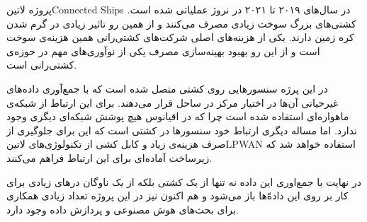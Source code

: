 
پروژه ‌لاتین{Connected Ships} در سال‌های ۲۰۱۹ تا ۲۰۲۱ در نروژ عملیاتی شده است.
کشتی‌های بزرگ سوخت زیادی مصرف می‌کنند و از همین رو تاثیر زیادی در گرم شدن کره زمین دارند.
یکی از هزینه‌های اصلی شرکت‌های کشتی‌رانی همین هزینه‌ی سوخت است و از این رو بهبود بهینه‌سازی مصرف
یکی از نوآوری‌های مهم در حوزه‌ی کشتی‌رانی است.

در این پرژه سنسورهایی روی کشتی متصل شده است که با جمع‌آوری داده‌های غیرحیاتی آن‌ها در اختیار مرکز در ساحل قرار می‌دهند.
برای این ارتباط از شبکه‌ی ماهواره‌ای استفاده شده است چرا که در اقیانوس هیچ پوشش شبکه‌ای دیگری وجود ندارد.
اما مساله دیگری ارتباط خود سنسورها در کشتی است که این برای جلوگیری از صرف هزینه‌ی زیاد و کابل کشی از تکنولوژی‌های ‌لاتین{LPWAN}
استفاده خواهد شد که زیرساخت آماده‌ای برای این ارتباط فراهم می‌کنند.

در نهایت با جمع‌اوری این داده نه تنها از یک کشتی بلکه از یک ناوگان درهای زیادی برای کار بر روی این داده‌ّها باز می‌شود و هم اکنون نیز در این
پروژه تعداد زیادی همکاری برای بحث‌های هوش مصنوعی و پردازش داده وجود دارد.
